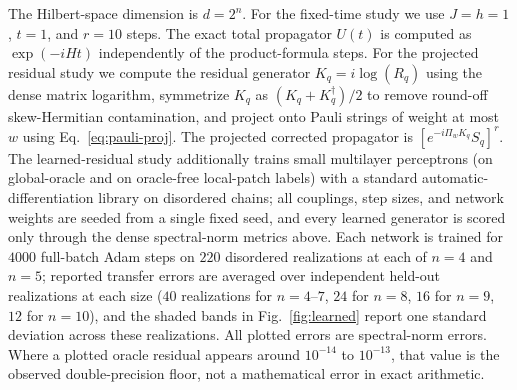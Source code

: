 \documentclass[aps,prxquantum,reprint,superscriptaddress,nofootinbib,amsmath,amssymb]{revtex4-2}
\begin{document}
The Hilbert-space dimension is $d=2^n$. For the fixed-time study we use $J=h=1$, $t=1$, and $r=10$ steps. The exact total propagator $U(t)$ is computed as $\exp(-iHt)$ independently of the product-formula steps. For the projected residual study we compute the residual generator $K_q=i\log(R_q)$ using the dense matrix logarithm, symmetrize $K_q$ as $(K_q+K_q^\dagger)/2$ to remove round-off skew-Hermitian contamination, and project onto Pauli strings of weight at most $w$ using Eq.~\eqref{eq:pauli-proj}. The projected corrected propagator is $[e^{-i\Pi_wK_q}S_q]^r$. The learned-residual study additionally trains small multilayer perceptrons (on global-oracle and on oracle-free local-patch labels) with a standard automatic-differentiation library on disordered chains; all couplings, step sizes, and network weights are seeded from a single fixed seed, and every learned generator is scored only through the dense spectral-norm metrics above. Each network is trained for $4000$ full-batch Adam steps on $220$ disordered realizations at each of $n=4$ and $n=5$; reported transfer errors are averaged over independent held-out realizations at each size ($40$ realizations for $n=4$--$7$, $24$ for $n=8$, $16$ for $n=9$, $12$ for $n=10$), and the shaded bands in Fig.~\ref{fig:learned} report one standard deviation across these realizations. All plotted errors are spectral-norm errors. Where a plotted oracle residual appears around $10^{-14}$ to $10^{-13}$, that value is the observed double-precision floor, not a mathematical error in exact arithmetic.
\end{document}
